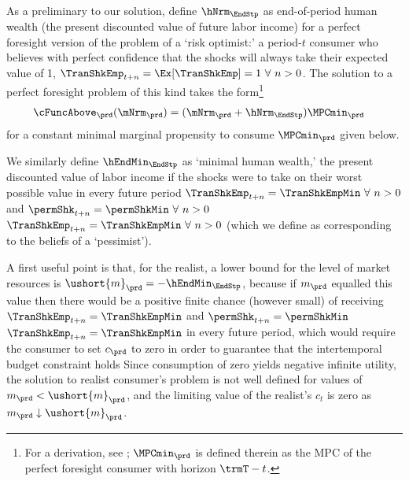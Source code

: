   As a preliminary to our solution, define $\hNrm_{\EndStp}$ as end-of-period human wealth (the present discounted value of future labor income) for a perfect foresight version of the problem of a `risk optimist:' a period-$t$ consumer who believes with perfect confidence that the shocks will always take their expected value of   {1, $\TranShkEmp_{t+n} = \Ex[\TranShkEmp]=1~\forall~n>0$.}  The solution to a perfect foresight problem of this kind takes the form\footnote{For a derivation, see \cite{BufferStockTheory}; $\MPCmin_{\prd}$ is defined therein as the MPC of the perfect foresight consumer with horizon $\trmT-t$.}
  \begin{equation}\begin{gathered}\begin{aligned}
        \cFuncAbove_{\prd}(\mNrm_{\prd})  & = (\mNrm_{\prd} + \hNrm_{\EndStp})\MPCmin_{\prd} \label{eq:cFuncAbove}
      \end{aligned}\end{gathered}\end{equation}
  for a constant minimal marginal propensity to consume $\MPCmin_{\prd}$ given below.

  We similarly define $\hEndMin_{\EndStp}$ as `minimal human wealth,' the
  present discounted value of labor income if the shocks were to take on
  their worst possible value in every future period \permShkOn
  {$\TranShkEmp_{t+n} = \TranShkEmpMin ~\forall~n>0$ and $\permShk_{t+n} =
    \permShkMin ~\forall~n>0$} {$\TranShkEmp_{t+n} = \TranShkEmpMin
    ~\forall~n>0$} (which we define as corresponding to the beliefs of a
  `pessimist').


  A first useful point is that, for the realist, a lower bound for the
  level of market resources is $\ushort{m}_{\prd} = -\hEndMin_{\EndStp}$, because
  if ${m}_{\prd}$ equalled this value then there would be a positive finite
  chance (however small) of receiving \permShkOn
  {$\TranShkEmp_{t+n}=\TranShkEmpMin$ and $\permShk_{t+n}=\permShkMin$}
  {$\TranShkEmp_{t+n}=\TranShkEmpMin$}
  in
  every future period, which would require the consumer to set ${c}_{\prd}$
  to zero in order to guarantee that the intertemporal budget constraint
  holds  Since consumption of zero yields negative
  infinite utility, the solution to realist consumer's problem is not well
  defined for values of ${m}_{\prd} < \ushort{m}_{\prd}$, and the limiting
  value of the realist's ${c}_t$ is zero as ${m}_{\prd} \downarrow \ushort{m}_{\prd}$.


